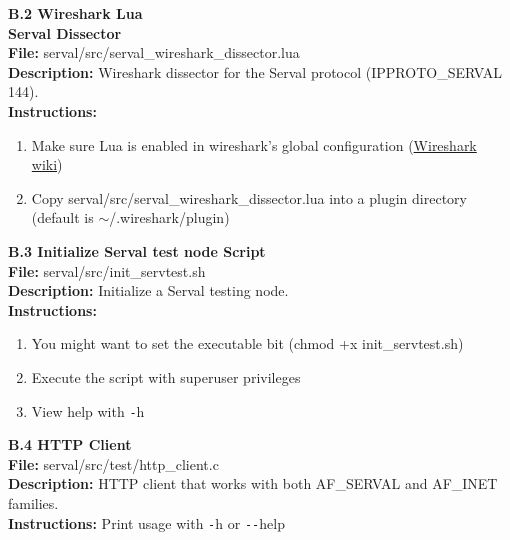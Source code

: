 \newpage
{}
{}
\label{sec:wirlua}
{\huge \bf \noindent B.2 Wireshark Lua\\ Serval Dissector}\\[0.5cm]
\textbf{File:} serval/src/serval\_wireshark\_dissector.lua\\
\textbf{Description:} Wireshark dissector for the Serval protocol (IPPROTO\_SERVAL 144).\\
\textbf{Instructions: }
\begin{enumerate} \itemsep1pt \parskip0pt 
	\item Make sure Lua is enabled in wireshark's global configuration (\href{http://wiki.wireshark.org/Lua}{Wireshark wiki})
	\item Copy serval/src/serval\_wireshark\_dissector.lua into a plugin directory (default is $\sim$/.wireshark/plugin)\\[0.5cm]
\end{enumerate}


\newpage
{}
{}
{\huge \bf \noindent B.3 Initialize Serval test node Script}\\[0.5cm]
\textbf{File:} serval/src/init\_servtest.sh\\
\textbf{Description:} Initialize a Serval testing node.\\
\textbf{Instructions: }
\begin{enumerate} \itemsep1pt \parskip0pt 
	\item You might want to set the executable bit (chmod +x init\_servtest.sh)
	\item Execute the script with superuser privileges
	\item View help with \texttt{-}h\\[0.5cm]
\end{enumerate}


\newpage
{}
{}
{\huge \bf \noindent B.4 HTTP Client}\\[0.5cm]
\textbf{File:} serval/src/test/http\_client.c\\
\textbf{Description:} HTTP client that works with both AF\_SERVAL and AF\_INET families.\\
\textbf{Instructions: } Print usage with \texttt{-}h or \texttt{{-}{-}}help\\[0.5cm]


